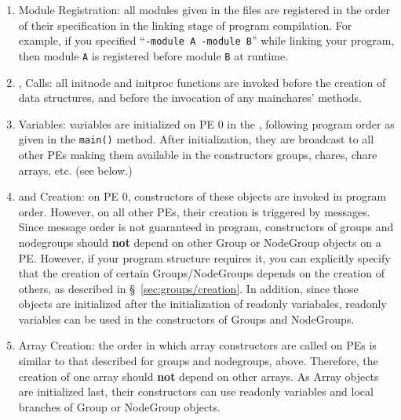 \begin{enumerate}
\item Module Registration: all modules given in the  files are registered in the order
of their specification in the linking stage of program compilation.
For example, if you specified ``{\tt -module A -module B}'' while linking your \charmpp{} program,
then module {\tt A} is registered before module {\tt B} at runtime.

\item {},  Calls: all initnode and initproc functions are invoked before the
creation of \charmpp{} data structures, and before the invocation of any
mainchares'  methods.

\item {} Variables:  variables are initialized on PE 0 in the ,
following program order as given in the {\tt main()} method. After initialization, they
are broadcast to all other PEs making them available in the constructors
groups, chares, chare arrays, etc. (see below.)

\item {} and  Creation: on PE 0, constructors of these
objects are invoked in program order. However, on all other PEs, their
creation is triggered by messages. Since message order is not guaranteed
in \charmpp{} program, constructors of groups and nodegroups should \textbf{not} depend 
on other Group or NodeGroup objects on a PE. However, if your program structure requires
it, you can explicitly specify that the creation of certain Groups/NodeGroups depends
on the creation of others, as described in \S~\ref{sec:groups/creation}.
In addition, since those objects are initialized
after the initialization of readonly variabales, readonly variables can be used
in the constructors of Groups and NodeGroups.

\item \charmpp{} Array Creation: the order in which array constructors are called on PEs is
similar to that described for groups and nodegroups, above.
Therefore, the creation of one array should \textbf{not} depend on other arrays.
As Array objects are initialized last, their constructors can use 
readonly variables and local branches of Group or NodeGroup objects.
\end{enumerate}
